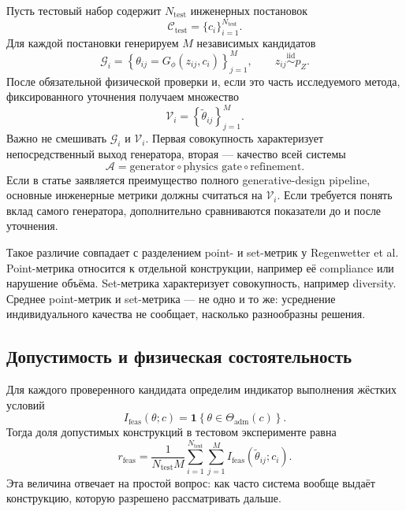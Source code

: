 Пусть тестовый набор содержит $N_{\mathrm{test}}$ инженерных постановок
\begin{equation}
 \mathcal C_{\mathrm{test}}
 =\{c_i\}_{i=1}^{N_{\mathrm{test}}}.
\end{equation}
Для каждой постановки генерируем $M$ независимых кандидатов
\begin{equation}
 \mathcal G_i
 =\left\{
  \theta_{ij}=G_\phi(z_{ij},c_i)
 \right\}_{j=1}^{M},
 \qquad
 z_{ij}\overset{\mathrm{iid}}{\sim}p_Z.
\end{equation}
После обязательной физической проверки и, если это часть исследуемого метода, фиксированного уточнения получаем множество
\begin{equation}
 \mathcal V_i
 =\left\{
  \widetilde\theta_{ij}
 \right\}_{j=1}^{M}.
\end{equation}
Важно не смешивать $\mathcal G_i$ и $\mathcal V_i$. Первая совокупность характеризует непосредственный выход генератора, вторая --- качество всей системы
\begin{equation}
 \mathcal A
 =
 \text{generator}
 \circ
 \text{physics gate}
 \circ
 \text{refinement}.
\end{equation}
Если в статье заявляется преимущество полного generative-design pipeline, основные инженерные метрики должны считаться на $\mathcal V_i$. Если требуется понять вклад самого генератора, дополнительно сравниваются показатели до и после уточнения.

Такое различие совпадает с разделением point- и set-метрик у Regenwetter et al. Point-метрика относится к отдельной конструкции, например её compliance или нарушение объёма. Set-метрика характеризует совокупность, например diversity. Среднее point-метрик и set-метрика --- не одно и то же: усреднение индивидуального качества не сообщает, насколько разнообразны решения.

\subsection{Допустимость и физическая состоятельность}

Для каждого проверенного кандидата определим индикатор выполнения жёстких условий
\begin{equation}
 I_{\mathrm{feas}}(\theta;c)
 =
 \mathbf 1\!\left\{
  \theta\in\Theta_{\mathrm{adm}}(c)
 \right\}.
\end{equation}
Тогда доля допустимых конструкций в тестовом эксперименте равна
\begin{equation}
 r_{\mathrm{feas}}
 =
 \frac{1}{N_{\mathrm{test}}M}
 \sum_{i=1}^{N_{\mathrm{test}}}
 \sum_{j=1}^{M}
 I_{\mathrm{feas}}(\widetilde\theta_{ij};c_i).
\end{equation}
Эта величина отвечает на простой вопрос: как часто система вообще выдаёт конструкцию, которую разрешено рассматривать дальше.

